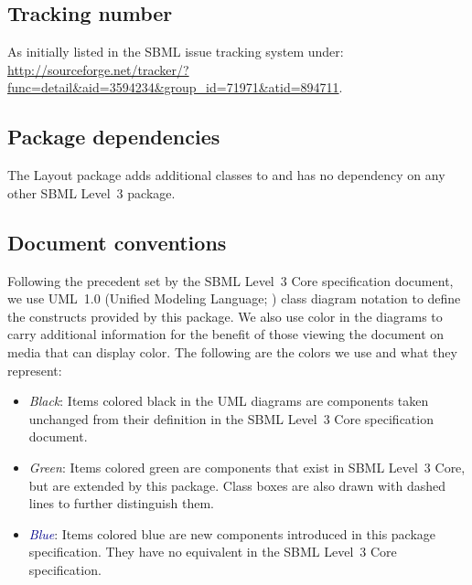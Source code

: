 \subsection{Tracking number}
As initially listed in the SBML issue tracking system under: \url{http://sourceforge.net/tracker/?func=detail&aid=3594234&group_id=71971&atid=894711}.

\subsection{Package dependencies}

The Layout package adds additional classes to \sbmlthreecore and has no dependency on any other SBML Level~3 package.


\subsection{Document conventions}

\label{conventions}

Following the precedent set by the SBML Level~3 Core specification
document, we use UML~1.0 (Unified Modeling Language;
\citealt{eriksson:1998,oestereich:1999}) class diagram notation to
define the constructs provided by this package.  We also use color in
the diagrams to carry additional information for the benefit of those
viewing the document on media that can display color.  The following are
the colors we use and what they represent:

\begin{itemize}

\item[\raisebox{2.75pt}{\colorbox{black}{\rule{0.8pt}{0.8pt}}}]
  \emph{Black}: Items colored black in the UML diagrams are components
  taken unchanged from their definition in the SBML Level~3 Core
  specification document.

\item[\raisebox{2.75pt}{\colorbox{mediumgreen}{\rule{0.8pt}{0.8pt}}}]
  \emph{\textcolor{mediumgreen}{Green}}: Items colored green are
  components that exist in SBML Level~3 Core, but are extended by this
  package.  Class boxes are also drawn with dashed lines to further
  distinguish them.

\item[\raisebox{2.75pt}{\colorbox{darkblue}{\rule{0.8pt}{0.8pt}}}]
  \emph{\textcolor{darkblue}{Blue}}: Items colored blue are new
  components introduced in this package specification.  They have no
  equivalent in the SBML Level~3 Core specification.

\end{itemize}

